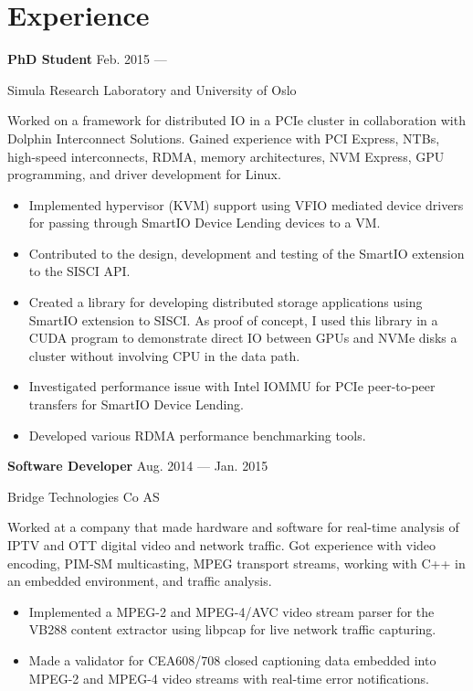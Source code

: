 \section{Experience}
\parbox[t][][t]{\linewidth}{
	\parbox{\linewidth}{\textbf{PhD Student}
		\hfill {{Feb. 2015 --- \phantom{Sep. 2018}}}}
		\smallbreak
	\parbox{\linewidth}{Simula Research Laboratory and University of Oslo}

	\bigskip
	Worked on a framework for distributed IO in a PCIe cluster in
	collaboration with Dolphin Interconnect Solutions. Gained
	experience with PCI Express,  NTBs, high-speed interconnects, RDMA, memory
	architectures, NVM Express, GPU programming, and driver development for Linux.

	\bigskip
	\begin{itemize}
		\item{Implemented hypervisor (KVM) support using VFIO mediated device drivers
			for passing through SmartIO Device Lending devices to a VM.}\\[-.6em]
		\item{Contributed to the design, development and testing of the SmartIO
			extension to the SISCI API.}\\[-.6em]
		\item{Created a library for developing distributed storage
			applications using SmartIO extension to SISCI.
			As proof of concept, I used this library in a CUDA program to demonstrate direct
			IO between GPUs and NVMe disks a cluster without
			involving CPU in the data path.}\\[-.6em]
		\item{Investigated performance issue with Intel IOMMU for PCIe
			peer-to-peer transfers for SmartIO Device Lending.}\\[-.6em]
		\item{Developed various RDMA performance benchmarking tools.}
	\end{itemize}
	\bigskip
	\bigskip
}

\parbox[t][][t]{\linewidth}{
	\parbox{\linewidth}{\textbf{Software Developer}
		\hfill {{Aug. 2014 --- Jan. 2015}}}
		\smallbreak
	\parbox{\linewidth}{Bridge Technologies Co AS}

	\bigskip
	Worked at a company that made hardware and software
	for real-time analysis of IPTV and OTT digital video and network
	traffic. Got experience with video encoding, PIM-SM multicasting, MPEG transport
	streams, working with C++ in an embedded environment, and
	traffic analysis.

	\bigskip
	\begin{itemize}
		\item{Implemented a MPEG-2 and MPEG-4/AVC video stream parser for the
			VB288 content extractor using libpcap for live network
			traffic capturing.}\\[-.6em]
		\item{Made a validator for CEA608/708 closed captioning data
		embedded into MPEG-2 and MPEG-4 video streams with real-time
			error notifications.}
	\end{itemize}
	\bigskip
	\bigskip
}

